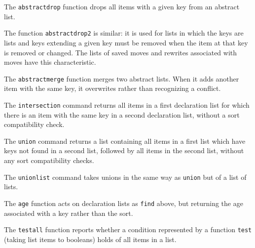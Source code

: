 \documentclass{article}
\begin{document}
The {\tt abstractdrop} function drops all items with a given key from an abstract list.

The function {\tt abstractdrop2} is similar:  it is used for lists in which the keys are lists and keys extending
a given key must be removed when the item at that key is removed or changed.  The lists of saved moves and rewrites associated with moves have this
characteristic.


The {\tt abstractmerge} function merges two abstract lists.  When it adds another item with the same key, it overwrites rather than recognizing a conflict.


The {\tt intersection} command returns all items in a first declaration list for which there is an item with the same key in a second declaration list, without a sort compatibility check.

The {\tt union} command returns a list containing all items in a first list which have keys not found in a second list, followed by all items in the second list, without any sort compatibility checks.

The {\tt unionlist} command takes unions in the same way as {\tt union} but of a list of lists.

The {\tt age} function acts on declaration lists as {\tt find} above, but returning the age associated with a key rather than the sort.

The {\tt testall} function reports whether a condition represented by a function {\tt test} (taking list items to booleans) holds of all items in a list.
\end{document}
